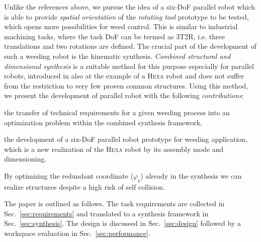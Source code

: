 \documentclass[runningheads,hidelinks]{llncs}
\begin{document}
Unlike the references above, we pursue the idea of a six-DoF parallel robot which is able to provide \emph{spatial orientation} of the \emph{rotating tool} prototype to be tested, which opens more possibilities for weed control.
This is similar to industrial machining tasks, where the task DoF can be termed as 3T2R, i.e. three translations and two rotations are defined.
The crucial part of the development of such a weeding robot is the kinematic synthesis. %
\emph{Combined structural and dimensional synthesis} is a suitable method for this purpose especially for parallel robots, introduced in \cite{Krefft2006} also at the example of a \textsc{Hexa} robot and does not suffer from the restriction to very few proven common structures. 
Using this method, we present the development of parallel robot  with the following \emph{contributions}:
\begin{compactitem}
    \item the transfer of technical requirements for a given weeding process into an optimization problem within the combined synthesis framework,
    \item the development of a six-DoF parallel robot prototype for weeding application, which is a new realization of the \textsc{Hexa} robot by its assembly mode and dimensioning. 
    \item By optimizing the redundant coordinate ($\varphi_\text{z}$) already in the synthesis we can realize structures despite a high risk of self collision.\\
\end{compactitem}

The paper is outlined as follows.
The task requirements are collected in Sec.~\ref{sec:requirements} and translated to a synthesis framework in Sec.~\ref{sec:synthesis}.
The design is discussed in Sec.~\ref{sec:design} followed by a workspace evaluation in Sec.~\ref{sec:performance}.
% 
% 
\end{document}
